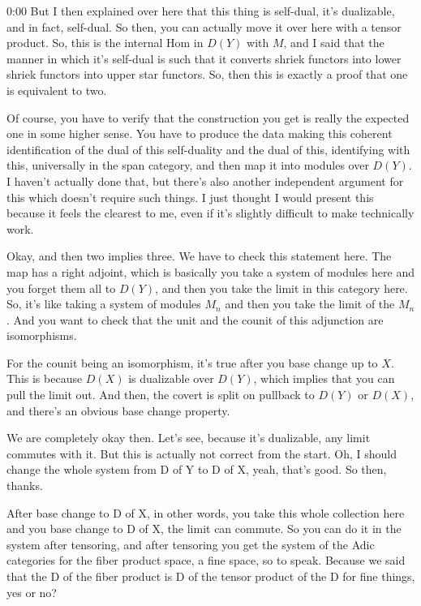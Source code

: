 \begin{unfinished}{0:00}
But I then explained over here that this thing is self-dual, it's dualizable, and in fact, self-dual. So then, you can actually move it over here with a tensor product. So, this is the internal Hom in $D(Y)$ with $M$, and I said that the manner in which it's self-dual is such that it converts shriek functors into lower shriek functors into upper star functors. So, then this is exactly a proof that one is equivalent to two.

Of course, you have to verify that the construction you get is really the expected one in some higher sense. You have to produce the data making this coherent identification of the dual of this self-duality and the dual of this, identifying with this, universally in the span category, and then map it into modules over $D(Y)$. I haven't actually done that, but there's also another independent argument for this which doesn't require such things. I just thought I would present this because it feels the clearest to me, even if it's slightly difficult to make technically work.

Okay, and then two implies three. We have to check this statement here. The map has a right adjoint, which is basically you take a system of modules here and you forget them all to $D(Y)$, and then you take the limit in this category here. So, it's like taking a system of modules $M_n$ and then you take the limit of the $M_n$. And you want to check that the unit and the counit of this adjunction are isomorphisms.

For the counit being an isomorphism, it's true after you base change up to $X$. This is because $D(X)$ is dualizable over $D(Y)$, which implies that you can pull the limit out. And then, the covert is split on pullback to $D(Y)$ or $D(X)$, and there's an obvious base change property.


We are completely okay then. Let's see, because it's dualizable, any limit commutes with it. But this is actually not correct from the start. Oh, I should change the whole system from D of Y to D of X, yeah, that's good. So then, thanks.

After base change to D of X, in other words, you take this whole collection here and you base change to D of X, the limit can commute. So you can do it in the system after tensoring, and after tensoring you get the system of the Adic categories for the fiber product space, a fine space, so to speak. Because we said that the D of the fiber product is D of the tensor product of the D for fine things, yes or no?


\end{unfinished}
